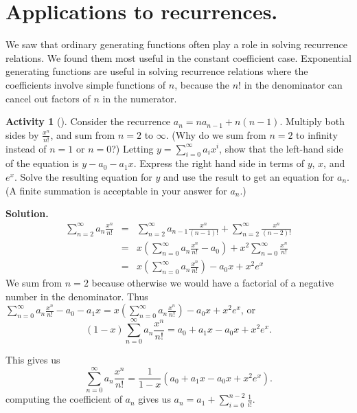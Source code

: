 \documentclass[10pt,]{book}
\theoremstyle{plain}
\theoremstyle{definition}
\newtheorem{activity}[project]{Activity}
\numberwithin{equation}{chapter}
\newcommand{\amp}{&}
\begin{document}
\section[{Applications to recurrences.}]{Applications to recurrences.}\label{section-26}
\typeout{************************************************}
\typeout{************************************************}
We saw that ordinary generating functions often play a role in solving recurrence relations. We found them most useful in the constant coefficient case. Exponential generating functions are useful in solving recurrence relations where the coefficients involve simple functions of \(n\), because the \(n!\) in the denominator can cancel out factors of \(n\) in the numerator.%
\begin{activity}[]\label{activity-348}
Consider the recurrence \(a_n=na_{n-1} +n(n-1)\). Multiply both sides by \(\frac{x^n}{n!}\), and sum from \(n=2\) to \(\infty\). (Why do we sum from \(n=2\) to infinity instead of \(n=1\) or \(n=0\)?) Letting \(y =
\sum_{i=0}^\infty a_ix^i\), show that the left-hand side of the equation is \(y-a_0 -a_1x\). Express the right hand side in terms of \(y\), \(x\), and \(e^x\). Solve the resulting equation for \(y\) and use the result to get an equation for \(a_n\). (A finite summation is acceptable in your answer for \(a_n\).)%
\par\medskip\noindent%
\textbf{Solution.}\quad %
\begin{align*}
\sum_{n=2}^\infty a_n\frac{x^n}{n!}
\amp =\amp \sum_{n=2}^\infty a_{n-1}\frac{x^n}{(n-1)!} + \sum_{n=2}^\infty
\frac{x^n}{(n-2)!}\\
\amp =\amp  x\left(\sum_{n=0}^\infty a_n\frac{x^n}{n!} - a_0\right) +
x^2\sum_{n=0}^\infty \frac{x^n}{n!}\\
\amp =\amp  x\left(\sum_{n=0}^\infty a_n\frac{x^n}{n!}\right) - a_0x
+x^2e^x
\end{align*}
We sum from \(n=2\) because otherwise we would have a factorial of a negative number in the denominator. Thus \(\sum_{n=0}^\infty a_n\frac{x^n}{n!} -a_0-a_1x =  x\left(\sum_{n=0}^\infty a_n\frac{x^n}{n!}\right) - a_0x
+x^2e^x\), or%
\begin{equation*}
(1-x)\sum_{n=0}^\infty a_n\frac{x^n}{n!}=a_0+a_1x-a_0x +x^2e^x.
\end{equation*}
%
\par
This gives us%
\begin{equation*}
\sum_{n=0}^\infty a_n\frac{x^n}{n!}=\frac{1}{1-x}(a_0+a_1x-a_0x
+x^2e^x).
\end{equation*}
computing the coefficient of \(a_n\) gives us \(a_n = a_1 +\sum_{i=0}^{n-2}
\frac{1}{i!}\).%
\end{activity}
\end{document}
